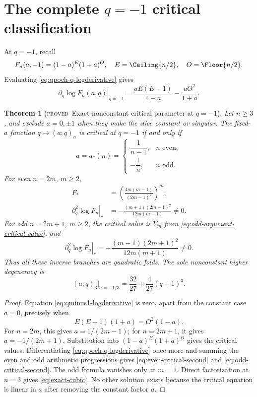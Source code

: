 \documentclass[11pt,letterpaper,oneside,openany]{book}
\newtheorem{theorem}{Theorem}[chapter]
\theoremstyle{definition}
\theoremstyle{remark}
\newcommand{\statusproved}{\textcolor{provedgreen}{\textsc{proved}}}
\begin{document}
\section{The complete \texorpdfstring{\(q=-1\)}{q=-1} critical classification}
\label{sec:minus-one-complete}
At \(q=-1\), recall
\[
 F_n(a,-1)=(1-a)^E(1+a)^O,
 \quad E=\Ceiling{n/2},\quad O=\Floor{n/2}.
\]
Evaluating \eqref{eq:qpoch-q-logderivative} gives
\begin{equation}\label{eq:qminus1-logderivative}
 \left.\partial_q\log F_n(a,q)\right|_{q=-1}
 =\frac{aE(E-1)}{1-a}-\frac{aO^2}{1+a}.
\end{equation}

\begin{theorem}[\statusproved\ Exact nonconstant critical parameter at
\(q=-1\)]
Let \(n\ge3\), and exclude \(a=0,\pm1\) when they make the slice constant or
singular.  The fixed-\(a\) function \(q\mapsto(a;q)_n\) is critical at
\(q=-1\) if and only if
\[
 a=a_*(n)=
 \begin{cases}
 \dfrac1{n-1},&n\text{ even},\\[0.6em]
 -\dfrac1n,&n\text{ odd}.
 \end{cases}
\]
For even \(n=2m\), \(m\ge2\),
\begin{align}
 F_*&=\left(\frac{4m(m-1)}{(2m-1)^2}\right)^m,\label{eq:even-critical-value}\\
 \left.\partial_q^2\log F_n\right|_*
 &=-\frac{(m+1)(2m-1)^2}{12m(m-1)}\ne0.
 \label{eq:even-critical-second}
\end{align}
For odd \(n=2m+1\), \(m\ge2\), the critical value is \(Y_m\) from
\eqref{eq:odd-argument-critical-value}, and
\begin{equation}\label{eq:odd-critical-second}
 \left.\partial_q^2\log F_n\right|_*
 =-\frac{(m-1)(2m+1)^2}{12m(m+1)}\ne0.
\end{equation}
Thus all these inverse branches are quadratic folds.  The sole nonconstant
higher degeneracy is
\begin{equation}\label{eq:exact-cubic}
 (a;q)_3\big|_{a=-1/3}
 =\frac{32}{27}+\frac4{27}(q+1)^3.
\end{equation}
\end{theorem}
\begin{proof}
Equation \eqref{eq:qminus1-logderivative} is zero, apart from the constant
case \(a=0\), precisely when
\[
 E(E-1)(1+a)=O^2(1-a).
\]
For \(n=2m\), this gives \(a=1/(2m-1)\); for \(n=2m+1\), it gives
\(a=-1/(2m+1)\).  Substitution into \((1-a)^E(1+a)^O\) gives the critical
values.  Differentiating \eqref{eq:qpoch-q-logderivative} once more and summing
the even and odd arithmetic progressions gives
\eqref{eq:even-critical-second} and \eqref{eq:odd-critical-second}.  The odd
formula vanishes only at \(m=1\).  Direct factorization at \(n=3\) gives
\eqref{eq:exact-cubic}.  No other solution exists because the critical
equation is linear in \(a\) after removing the constant factor \(a\).
\end{proof}
\end{document}
